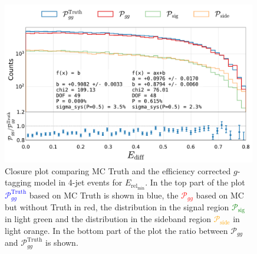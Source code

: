 \begin{figure}
  \centerfloat
  \includegraphics[width=0.99\textwidth, trim=10 0 20 5, clip, page=2]{figures/quarks/gtag-closure_test-down_sample=1.00-ML_vars=vertex-selection=b-ejet_min=4-n_iter_RS_lgb=99-n_iter_RS_xgb=9-cdot_cut=0.90-version=19-njet=4.pdf}
  \caption[Closure Plot Comparing MC Truth and the Efficiency Corrected $g$-Tagging Model in 4-Jet Events for $E_{\mathrm{rel}_\mathrm{min}}$]
          {Closure plot comparing MC Truth and the efficiency corrected $g$-tagging model in 4-jet events for $E_{\mathrm{rel}_\mathrm{min}}$. In the top part of the plot \textcolor{blue}{$\mathcal{P}_{gg}^\mathrm{Truth}$} based on MC Truth is shown in blue, the \textcolor{red}{$\mathcal{P}_{gg}$} based on MC but without Truth in red, the distribution in the signal region \textcolor{green}{$\mathcal{P}_{\mathrm{sig}}$} in light green and the distribution in the sideband region \textcolor{orange}{$\mathcal{P}_{\mathrm{side}}$} in light orange. In the bottom part of the plot the ratio between $\mathcal{P}_{gg}$ and $\mathcal{P}_{gg}^\mathrm{Truth}$  is shown. } 
  \label{fig:q:closure_E_rel_min}
\end{figure}

